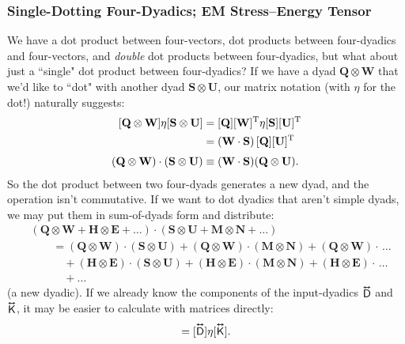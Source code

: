 \documentclass[12pt]{article}
\renewcommand{\vv}[1]{\mathbf{#1}}
\newcommand{\tightoverset}[2]{%
  \mathop{#2}\limits^{\vbox to -.5ex{\kern-0.75ex\hbox{$#1$}\vss}}}
\newcommand{\inlinedy}[1]{\tightoverset{\text{\tiny$\bm\leftrightarrow$}}{#1}}
\newcommand{\capdy}[1]{ \overset{ \text{\tiny$\bm\leftrightarrow$} }{\vphantom{\text{\small{A}}}\smash{#1}} }
\begin{document}
\subsubsection{Single-Dotting Four-Dyadics; EM Stress--Energy Tensor}

We have a dot product between four-vectors, dot products between four-dyadics and four-vectors, and \emph{double} dot products between four-dyadics, but what about just a ``single" dot product between four-dyadics? If we have a dyad $\vv Q \otimes \vv W$ that we'd like to ``dot" with another dyad $\vv S \otimes \vv U$, our matrix notation (with $\eta$ for the dot!) naturally suggests:
\begin{equation*}
\begin{aligned}
\mkern0mu [ \vv Q \otimes \vv W ] \eta [ \vv S \otimes \vv U ] &= [\vv Q][\vv W]^{\mathrm{T}} \eta [\vv S][\vv U]^{\mathrm{T}} \\
&= (\vv W \cdot \vv S) \, [\vv Q] [\vv U]^{\mathrm{T}} \\[3pt]
(\vv Q \otimes \vv W) \cdot (\vv S \otimes \vv U) & \equiv (\vv W \cdot \vv S) (\vv Q \otimes \vv U) .
\end{aligned}
\end{equation*}
So the dot product between two four-dyads generates a new dyad, and the operation isn't commutative. If we want to dot dyadics that aren't simple dyads, we may put them in sum-of-dyads form and distribute:
\begin{equation*}
\begin{aligned}
&(\vv Q \otimes \vv W + \vv H \otimes \vv E + \dots ) \cdot (\vv S \otimes \vv U + \vv M \otimes \vv N + \dots ) \\[3pt]
&\qquad = (\vv Q \otimes \vv W) \cdot (\vv S \otimes \vv U) + (\vv Q \otimes \vv W) \cdot (\vv M \otimes \vv N) + (\vv Q \otimes \vv W) \cdot \, \dots \\
& \qquad \quad + (\vv H \otimes \vv E) \cdot (\vv S \otimes \vv U) + (\vv H \otimes \vv E) \cdot (\vv M \otimes \vv N) + (\vv H \otimes \vv E) \cdot \, \dots \\
& \qquad \quad + \dots
\end{aligned}
\end{equation*}
(a new dyadic). If we already know the components of the input-dyadics $\inlinedy{\mathsf{D}}$ and $\inlinedy{\mathsf{K}}$, it may be easier to calculate with matrices directly:
\begin{equation*}
[\capdy{\mathsf{D}} \cdot \capdy{\mathsf{K}}] = [\capdy{\mathsf{D}}] \eta [\capdy{\mathsf{K}}] .
\end{equation*}
\end{document}
